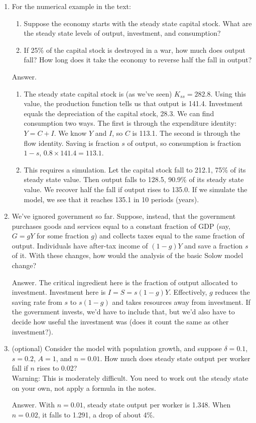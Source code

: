\documentclass[letterpaper,12pt]{article}
\begin{document}
\begin{enumerate}

\item For the numerical example in the text:
\begin{enumerate}
\item Suppose the economy starts with the steady state capital stock.
What are the steady state levels of output, investment, and consumption?
\item If 25\% of the capital stock is destroyed in a war,
how much does output fall?
How long does it take the economy to reverse half the fall in output?
\end{enumerate}

Answer.
\begin{enumerate}
\item The steady state capital stock is (as we've seen) $K_{ss} = 282.8$.
Using this value, the production function tells us that output is 141.4.
Investment equals the depreciation of the capital stock, 28.3.
We can find consumption two ways.
The first is through the expenditure identity:  $Y = C + I$.
We know $Y$ and $I$, so $C$ is 113.1.
The second is through the flow identity.
Saving is fraction $s$ of output, so consumption is fraction $1-s$,
$ 0.8 \times 141.4 = 113.1 $.

\item This requires a simulation.
Let the capital stock fall to 212.1, 75\% of its steady state value.
Then output falls to 128.5, 90.9\% of its steady state value.
We recover half the fall if output rises to 135.0.
If we simulate the model, we see that it reaches 135.1 in 10 periods
(years).
\end{enumerate}


\item We've ignored government so far.  Suppose, instead,
that the government purchases goods and services
equal to a constant fraction of GDP
(say, $ G = g Y$ for some fraction $g$)
 and collects taxes equal to the same fraction of output.
Individuals have after-tax income of $ (1-g) Y$ and save a
fraction $s$ of it.
With these changes, how would the analysis of the basic Solow model change?

Answer.  The critical ingredient here is the fraction of output allocated
to investment.
Investment here is $ I = S = s (1-g) Y $.
Effectively, $g$ reduces the saving rate from $s$ to $s(1-g)$
and takes resources away from investment.
If the government invests, we'd have to include that,
but we'd also have to decide how useful the investment was
(does it count the same as other investment?).

\item (optional) Consider the model with population growth, and suppose
$\delta = 0.1$, $s = 0.2$, $A = 1$, and $n = 0.01$. How much does
steady state output per worker fall if $n$ rises to 0.02? \\
Warning:  This is moderately difficult.
You need to work out the steady state on your own,
not apply a formula in the notes.

Answer.  With $n=0.01$, steady state output per worker is 1.348.
When $n=0.02$, it falls to 1.291, a drop of about 4\%.

\end{enumerate}
\end{document}
